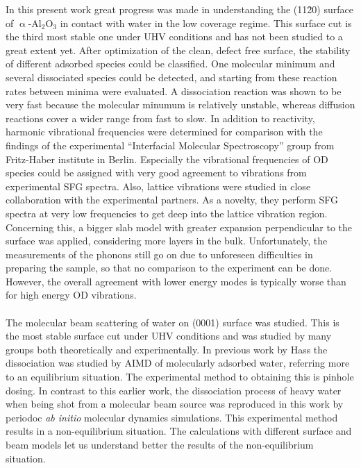 \documentclass[11pt,DIV=13,BCOR=5mm,a4paper,headinclude]{scrbook}
\begin{document}

In this present work great progress was made in understanding the (11\=20) surface of $\upalpha$-Al$_2$O$_3$ in contact with water in the low coverage regime.
This surface cut is the third most stable one under UHV conditions and has not been studied to a great extent yet.
After optimization of the clean, defect free surface, the stability of different adsorbed species could be classified.
One molecular minimum and several dissociated species could be detected, and starting from these reaction rates between minima were evaluated.
A dissociation reaction was shown to be very fast because the molecular minumum is relatively unstable, whereas diffusion reactions cover a wider range from fast to slow.
In addition to reactivity, harmonic vibrational frequencies were determined for comparison with the findings of the experimental ``Interfacial Molecular Spectroscopy'' group  from Fritz-Haber institute in Berlin.
Especially the vibrational frequencies of OD species could be assigned with very good agreement to vibrations from experimental SFG spectra.
Also, lattice vibrations were studied in close collaboration with the experimental partners.
As a novelty, they perform SFG spectra at very low frequencies to get deep into the lattice vibration region.
Concerning this, a bigger slab model with greater expansion perpendicular to the surface was applied, considering more layers in the bulk.
Unfortunately, the measurements of the phonons still go on due to unforeseen difficulties in preparing the sample, so that no comparison to the experiment can be done.
However, the overall agreement with lower energy modes is typically worse than for high energy OD vibrations.
\\\\
The molecular beam scattering of water on (0001) surface was studied.
This is the most stable surface cut under UHV conditions and was studied by many groups both theoretically and experimentally.
In previous work by Hass the dissociation was studied by AIMD of molecularly adsorbed water, referring more to an equilibrium situation.
The experimental method to obtaining this is pinhole dosing.
In contrast to this earlier work, the dissociation process of heavy water when being shot from a molecular beam source was reproduced in this work by periodoc \textit{ab initio} molecular dynamics simulations.
This experimental method results in a non-equilibrium situation.
The calculations with different surface and beam models let us understand better the results of the non-equilibrium situation.
\end{document}
